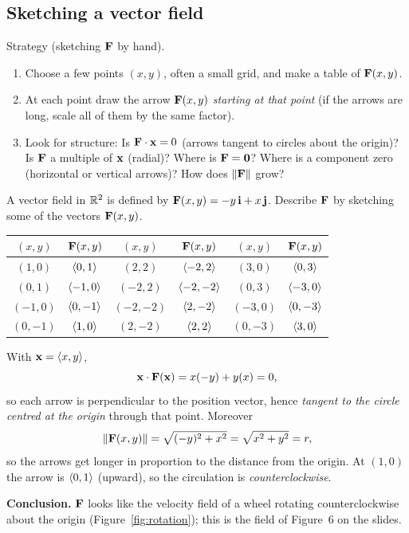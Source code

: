 \subsection{Sketching a vector field}

\begin{strategy}{Strategy (sketching $\mathbf{F}$ by hand).}
\begin{enumerate}
  \item Choose a few points $(x,y)$, often a small grid, and make a table of
        $\mathbf{F}(x,y)$.
  \item At each point draw the arrow $\mathbf{F}(x,y)$ \emph{starting at that point}
        (if the arrows are long, scale all of them by the same factor).
  \item Look for structure: Is $\mathbf{F}\cdot\mathbf{x}=0$ (arrows tangent to circles about
        the origin)? Is $\mathbf{F}$ a multiple of $\mathbf{x}$ (radial)? Where is $\mathbf{F}=\mathbf{0}$?
        Where is a component zero (horizontal or vertical arrows)? How does
        $\lVert\mathbf{F}\rVert$ grow?
\end{enumerate}
\end{strategy}

\begin{example}\label{ex:7.1}
A vector field in $\mathbb{R}^2$ is defined by $\mathbf{F}(x,y)=-y\,\mathbf{i}+x\,\mathbf{j}$. Describe $\mathbf{F}$
by sketching some of the vectors $\mathbf{F}(x,y)$.
\end{example}
\begin{solution}
\begin{center}
\renewcommand{\arraystretch}{1.2}
\begin{tabular}{cc@{\qquad}cc@{\qquad}cc}
\toprule
$(x,y)$ & $\mathbf{F}(x,y)$ & $(x,y)$ & $\mathbf{F}(x,y)$ & $(x,y)$ & $\mathbf{F}(x,y)$\\
\midrule
$(1,0)$ & $\left\langle 0,1 \right\rangle$ & $(2,2)$ & $\left\langle -2,2 \right\rangle$ & $(3,0)$ & $\left\langle 0,3 \right\rangle$\\
$(0,1)$ & $\left\langle -1,0 \right\rangle$ & $(-2,2)$ & $\left\langle -2,-2 \right\rangle$ & $(0,3)$ & $\left\langle -3,0 \right\rangle$\\
$(-1,0)$ & $\left\langle 0,-1 \right\rangle$ & $(-2,-2)$ & $\left\langle 2,-2 \right\rangle$ & $(-3,0)$ & $\left\langle 0,-3 \right\rangle$\\
$(0,-1)$ & $\left\langle 1,0 \right\rangle$ & $(2,-2)$ & $\left\langle 2,2 \right\rangle$ & $(0,-3)$ & $\left\langle 3,0 \right\rangle$\\
\bottomrule
\end{tabular}
\end{center}
 With $\mathbf{x}=\left\langle x,y \right\rangle$,
\[
  \mathbf{x}\cdot\mathbf{F}(\mathbf{x})=x(-y)+y(x)=0,
\]
so each arrow is perpendicular to the position vector, hence \emph{tangent to the
circle centred at the origin} through that point. Moreover
\[
  \lVert\mathbf{F}(x,y)\rVert=\sqrt{(-y)^2+x^2}=\sqrt{x^2+y^2}=r,
\]
so the arrows get longer in proportion to the distance from the origin. At
$(1,0)$ the arrow is $\left\langle 0,1 \right\rangle$ (upward), so the circulation is
\emph{counterclockwise}.

\textbf{Conclusion.} $\mathbf{F}$ looks like the velocity field of a wheel rotating
counterclockwise about the origin (Figure~\ref{fig:rotation}); this is the
field of Figure~6 on the slides.
\end{solution}

